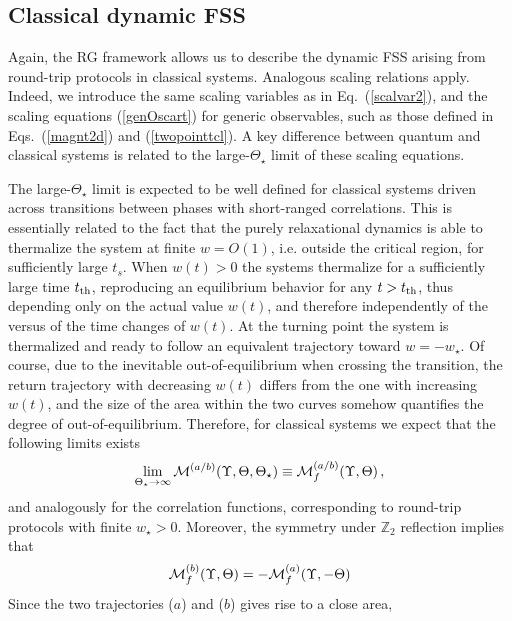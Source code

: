 \subsection{Classical dynamic FSS}
\label{cfssKZroundtrip}


Again, the RG framework allows us to describe the dynamic FSS arising
from round-trip protocols in classical systems. Analogous scaling
relations apply. Indeed, we introduce the same scaling variables as in
Eq.~(\ref{scalvar2}), and the scaling equations (\ref{genOscart}) for
generic observables, such as those defined in Eqs.~(\ref{magnt2d}) and
(\ref{twopointtcl}).  A key difference between quantum and classical
systems is related to the large-$\Theta_\star$ limit of these scaling
equations.


The large-$\Theta_\star$ limit is expected to be well defined for
classical systems driven across transitions between phases with
short-ranged correlations. This is essentially related to the fact
that the purely relaxational dynamics is able to thermalize the system
at finite $w=O(1)$, i.e. outside the critical region, for sufficiently
large $t_s$. When $w(t)>0$ the systems thermalize for a sufficiently
large time $t_{\rm th}$, reproducing an equilibrium behavior for any
$t>t_{\rm th}$, thus depending only on the actual value $w(t)$, and
therefore independently of the versus of the time changes of $w(t)$.
At the turning point the system is thermalized and ready to follow an
equivalent trajectory toward $w=-w_\star$.  Of course, due to the
inevitable out-of-equilibrium when crossing the transition, the return
trajectory with decreasing $w(t)$ differs from the one with increasing
$w(t)$, and the size of the area within the two curves somehow
quantifies the degree of out-of-equilibrium.  Therefore, for classical
systems we expect that the following limits exists
\begin{eqnarray}
  \lim_{\Theta_\star\to\infty}
      {\cal M}^{(a/b)}(\Upsilon,\Theta,\Theta_\star) \equiv
      {\cal M}_f^{(a/b)}(\Upsilon,\Theta)\,,
      \label{limthetastar}
\end{eqnarray}
and analogously for the correlation functions, corresponding to
round-trip protocols with finite $w_\star>0$.  Moreover, the symmetry
under ${\mathbb Z}_2$ reflection implies that 
\begin{eqnarray}
  {\cal M}_f^{(b)}(\Upsilon,\Theta) = - {\cal
    M}^{(a)}_f(\Upsilon,-\Theta)
  \label{partityimp}
  \end{eqnarray}
Since the two trajectories ($a$) and ($b$) gives rise to a close area,
